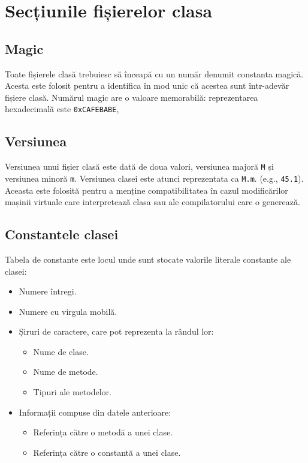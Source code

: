 \section{Secțiunile fișierelor clasa}

\subsection{Magic}

Toate fișierele clasă trebuiesc să înceapă cu un număr denumit constanta
magică. Acesta este folosit pentru a identifica în mod unic că acestea
sunt într-adevăr fișiere clasă. Numărul magic are o valoare memorabilă:
reprezentarea hexadecimală este \texttt{0xCAFEBABE},

\subsection{Versiunea}

Versiunea unui fișier clasă este dată de doua valori, versiunea majoră
\texttt{M} și versiunea minoră \texttt{m}. Versiunea clasei este atunci
reprezentata ca \texttt{M.m}. (e.g., \texttt{45.1}). Aceasta este
folosită pentru a menține compatibilitatea în cazul modificărilor
mașinii virtuale care interpretează clasa sau ale compilatorului care o
generează.

\subsection{Constantele clasei}

Tabela de constante este locul unde sunt stocate valorile literale
constante ale clasei:

\begin{itemize}
	\item Numere întregi.
	\item Numere cu virgula mobilă.
	\item Șiruri de caractere, care pot reprezenta la rândul lor:
	      \begin{itemize}
		      \item Nume de clase.
		      \item Nume de metode.
		      \item Tipuri ale metodelor.
	      \end{itemize}
	\item Informații compuse din datele anterioare:
	      \begin{itemize}
		      \item Referința către o metodă a unei clase.
		      \item Referința către o constantă a unei clase.
	      \end{itemize}
\end{itemize}


